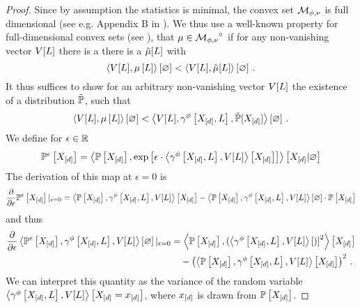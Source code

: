 \begin{proof}
    Since by assumption the statistics is minimal, the convex set $\mathcal{M}_{\phi,\nu}$ is full dimensional (see e.g. Appendix B in \cite{wainwright_graphical_2008}).
    We thus use a well-known property for full-dimensional convex sets (see \cite{rockafellar_convex_1997,hiriart-urruty_convex_1993}), that $\mu\in{\mathcal{M}_{\phi,\nu}}^{\circ}$ if for any non-vanishing vector $V[L]$ there is a  %
    there is a $\tilde{\mu}[L]$ with
    \[ \left\langle V[L],\mu\left[L\right]\right\rangle \left[ \varnothing \right] <  \left\langle V[L],\tilde{\mu}[L]\right\rangle \left[ \varnothing \right] \, . \]
    It thus suffices to show for an arbitrary non-vanishing vector $V[L]$ the existence of a distribution $\tilde{\mathbb{P}}$, such that
    \begin{align*}
        \left\langle V[L],\mu\left[L\right]\right\rangle \left[ \varnothing \right] < \left\langle V[L],\gamma^{\phi}\left[X_{[d]},L\right],\tilde{\mathbb{P}}[X_{[d]}]\right\rangle \left[ \varnothing \right] \, .
    \end{align*}
    We define for $\epsilon\in\mathbb{R}$
    \begin{align*}
        \mathbb{P}^{\epsilon}\left[X_{[d]}\right]
        = \left\langle \mathbb{P}\left[X_{[d]}\right],\mathrm{exp}\left[\epsilon\cdot\left\langle \gamma^{\phi}\left[X_{[d]},L\right],V[L]\right\rangle \left[ X_{[d]} \right]\right]\right\rangle \left[ X_{[d]} | \varnothing \right]
    \end{align*}
    The derivation of this map at $\epsilon=0$ is
    \begin{align*}
        \frac{\partial }{\partial \epsilon}\mathbb{P}^{\epsilon}\left[X_{[d]}\right]|_{\epsilon=0}
        = \left\langle \mathbb{P}\left[X_{[d]}\right],\gamma^{\phi}\left[X_{[d]},L\right],V[L]\right\rangle \left[ X_{[d]} \right] - \left\langle \mathbb{P}\left[X_{[d]}\right],\gamma^{\phi}\left[X_{[d]},L\right],V[L]\right\rangle \left[ \varnothing \right] \cdot \mathbb{P}\left[X_{[d]}\right]
    \end{align*}
    and thus
    \begin{align*}
        \frac{\partial }{\partial \epsilon} \left\langle \mathbb{P}^{\epsilon}\left[X_{[d]}\right],\gamma^{\phi}\left[X_{[d]},L\right],V[L]\right\rangle \left[ \varnothing \right]|_{\epsilon=0}
        &= \left\langle \mathbb{P}\left[X_{[d]}\right],(\left\langle \gamma^{\phi}\left[X_{[d]},L\right],V[L]\right\rangle \left[ ) \right]^2\right\rangle \left[ X_{[d]} \right] \\
        & \quad - \left(\left\langle \mathbb{P}\left[X_{[d]}\right],\gamma^{\phi}\left[X_{[d]},L\right],V[L]\right\rangle \left[ X_{[d]} \right]\right)^2 \, .
    \end{align*}
    We can interpret this quantity as the variance of the random variable $\left\langle \gamma^{\phi}\left[X_{[d]},L\right],V[L]\right\rangle \left[ X_{[d]}=x_{[d]} \right]$, where $x_{[d]}$ is drawn from $\mathbb{P}\left[X_{[d]}\right]$.

\end{proof}
